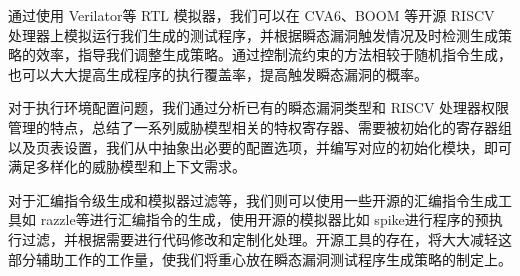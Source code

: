 通过使用 Verilator\cite{snyder2013verilator}等 RTL 模拟器，我们可以在 CVA6、BOOM 等开源 RISCV 处理器上模拟运行我们生成的测试程序，并根据瞬态漏洞触发情况及时检测生成策略的效率，指导我们调整生成策略。通过控制流约束的方法相较于随机指令生成，也可以大大提高生成程序的执行覆盖率\cite{soltcascade}，提高触发瞬态漏洞的概率。\par

对于执行环境配置问题，我们通过分析已有的瞬态漏洞类型和 RISCV 处理器权限管理\cite{watermanrisc}的特点，总结了一系列威胁模型相关的特权寄存器、需要被初始化的寄存器组以及页表设置，我们从中抽象出必要的配置选项，并编写对应的初始化模块，即可满足多样化的威胁模型和上下文需求。\par

对于汇编指令级生成和模拟器过滤等，我们则可以使用一些开源的汇编指令生成工具如 razzle\cite{razzle}等进行汇编指令的生成，使用开源的模拟器比如 spike\cite{riscv-isa-sim}进行程序的预执行过滤，并根据需要进行代码修改和定制化处理。开源工具的存在，将大大减轻这部分辅助工作的工作量，使我们将重心放在瞬态漏洞测试程序生成策略的制定上。\par
